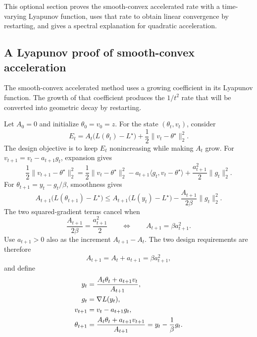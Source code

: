 \documentclass[11pt,twoside]{article}
\theoremstyle{definition}
\theoremstyle{remark}
\begin{document}
This optional section proves the smooth-convex accelerated rate with a
time-varying Lyapunov function, uses that rate to obtain linear convergence by
restarting, and gives a spectral explanation for quadratic acceleration.

\subsection{A Lyapunov proof of smooth-convex acceleration}
\label{sec:convex-acceleration-lyapunov}

The smooth-convex accelerated method uses a growing coefficient in its
Lyapunov function. The growth of that coefficient produces the $1/t^2$ rate
that will be converted into geometric decay by restarting.

Let $A_0=0$ and initialize $\theta_0=v_0=z$. For the state
$(\theta_t,v_t)$, consider
\begin{equation}
 E_t=A_t\bigl(L(\theta_t)-L^\star\bigr)
 +\frac12\|v_t-\theta^\star\|_2^2.
 \label{eq:convex-acceleration-potential}
\end{equation}
The design objective is to keep $E_t$ nonincreasing while making $A_t$ grow.
For $v_{t+1}=v_t-a_{t+1}g_t$, expansion gives
\begin{equation}
 \frac12\|v_{t+1}-\theta^\star\|_2^2
 =\frac12\|v_t-\theta^\star\|_2^2
 -a_{t+1}\langle g_t,v_t-\theta^\star\rangle
 +\frac{a_{t+1}^2}{2}\|g_t\|_2^2.
 \label{eq:convex-acceleration-state-step}
\end{equation}
For $\theta_{t+1}=y_t-g_t/\beta$, smoothness gives
\begin{equation}
 A_{t+1}\bigl(L(\theta_{t+1})-L^\star\bigr)
 \le A_{t+1}\bigl(L(y_t)-L^\star\bigr)
 -\frac{A_{t+1}}{2\beta}\|g_t\|_2^2.
 \label{eq:convex-acceleration-smooth-step}
\end{equation}
The two squared-gradient terms cancel when
\begin{equation*}
 \frac{A_{t+1}}{2\beta}=\frac{a_{t+1}^2}{2}
 \qquad\Longleftrightarrow\qquad
 A_{t+1}=\beta a_{t+1}^2.
\end{equation*}
Use $a_{t+1}>0$ also as the increment $A_{t+1}-A_t$. The two design
requirements are therefore
\begin{equation}
 A_{t+1}=A_t+a_{t+1}=\beta a_{t+1}^2,
 \label{eq:convex-acceleration-weights}
\end{equation}
and define
\begin{align}
 y_t&=\frac{A_t\theta_t+a_{t+1}v_t}{A_{t+1}},\notag\\
 g_t&=\nabla L(y_t),\notag\\
 v_{t+1}&=v_t-a_{t+1}g_t,\notag\\
 \theta_{t+1}&=\frac{A_t\theta_t+a_{t+1}v_{t+1}}{A_{t+1}}
 =y_t-\frac1\beta g_t.
 \label{eq:convex-accelerated-coupling}
\end{align}
\end{document}
